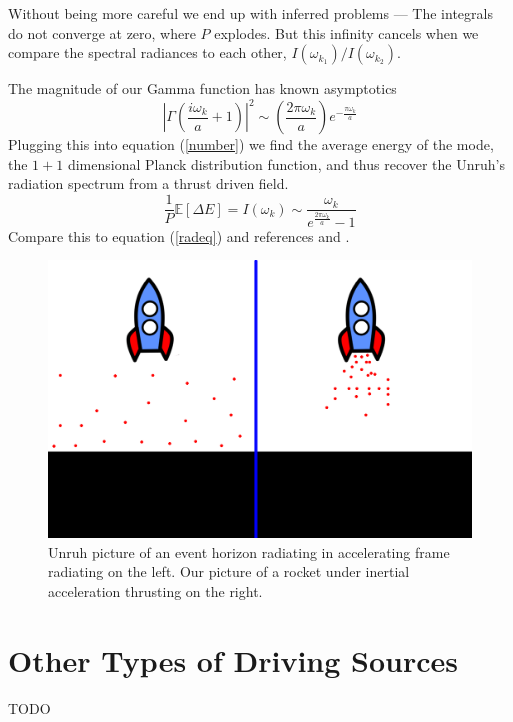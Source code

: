 \documentclass[12pt,a4paper]{article}
\begin{document}
Without being more careful we end up with inferred problems --- The integrals do not converge at zero, where $P$ explodes.  But this infinity cancels when we compare the spectral radiances to each other, $I(\omega_{k_1}) / I(\omega_{k_2})$.

The magnitude of our Gamma function has known asymptotics \cite[Eq.~5.11.9]{NIST:DLMF}
\begin{equation}
\left|\Gamma\left(\frac{i\omega_k}{a} + 1\right) \right|^2 \sim \left(\frac{2 \pi \omega_k} {a}\right) e^{-\frac{\pi\omega_k}{a}}
\end{equation}
Plugging this into equation (\ref{number}) we find the average energy of the mode, the $1+1$ dimensional Planck distribution function, and thus recover the Unruh's radiation spectrum from a thrust driven field.
\begin{equation}
\frac{1}{P} \mathbb{E}[\Delta E] = I(\omega_k) \sim \frac{\omega_k}{e^{\frac{2 \pi \omega_k}{a}}-1}
\end{equation}
Compare this to equation (\ref{radeq}) and references \cite{unruh} and \cite{Frodden}.

\begin{figure}[h]
\centering
\includegraphics[scale=0.5]{rocket_inertial.png}
\caption{Unruh picture of an event horizon radiating in accelerating frame radiating on the left. Our picture of a rocket under inertial acceleration thrusting on the right.}
\label{rocket_inertial}
\end{figure}

\section{Other Types of Driving Sources}
TODO
\end{document}
